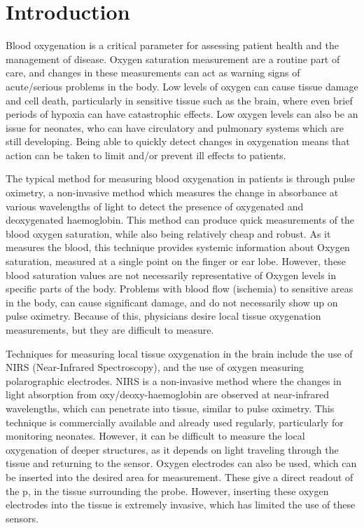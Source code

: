 \chapter{Introduction}\label{ch:intro}

Blood oxygenation is a critical parameter for assessing patient health and the management of disease.
Oxygen saturation measurement are a routine part of care, and changes in these measurements can act as warning signs of acute/serious problems in the body.
Low levels of oxygen can cause tissue damage and cell death, particularly in sensitive tissue such as the brain, where even brief periods of hypoxia can have catastrophic effects.
Low oxygen levels can also be an issue for neonates, who can have circulatory and pulmonary systems which are still developing.
Being able to quickly detect changes in oxygenation means that action can be taken to limit and/or prevent ill effects to patients.

The typical method for measuring blood oxygenation in patients is through pulse oximetry, a non-invasive method which measures the change in absorbance at various wavelengths of light to detect the presence of oxygenated and deoxygenated haemoglobin.
This method can produce quick measurements of the blood oxygen saturation, while also being relatively cheap and robust.
As it measures the blood, this technique provides systemic information about Oxygen saturation, measured at a single point on the finger or ear lobe.
However, these blood saturation values are not necessarily representative of Oxygen levels in specific parts of the body.
Problems with blood flow (ischemia) to sensitive areas in the body, can cause significant damage, and do not necessarily show up on pulse oximetry.
Because of this, physicians desire local tissue oxygenation measurements, but they are difficult to measure.

Techniques for measuring local tissue oxygenation in the brain include the use of NIRS (Near-Infrared Spectroscopy), and the use of oxygen measuring
polarographic electrodes.
NIRS is a non-invasive method where the changes in light absorption from oxy/deoxy-haemoglobin are observed at near-infrared wavelengths, which can penetrate
into tissue, similar to pulse oximetry.
This technique is commercially available and already used regularly, particularly for monitoring neonates.
However, it can be difficult to measure the local oxygenation of deeper structures, as it depends on light traveling through the tissue and returning to the sensor.
Oxygen electrodes can also be used, which can be inserted into the desired area for measurement.
These give a direct readout of the p\Otwo, in the tissue surrounding the probe.
However, inserting these oxygen electrodes into the tissue is extremely invasive, which has limited the use of these sensors.

